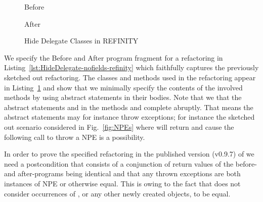 \begin{figure}[tbp]
  \captionsetup{type=lstlisting}
  \centering
  \begin{sublstlisting}[b]{.4\linewidth}
    
    \caption{Before}
    \label{lst:HideDelegate-nofields-resource-refinity}
  \end{sublstlisting}\hspace{1cm}
  \begin{sublstlisting}[b]{.4\linewidth}
    
    \caption{After}
    \label{lst:HideDelegate-nofields-owner-refinity}
  \end{sublstlisting}
\caption{Hide Delegate Classes in REFINITY}
\label{lst:HideDelegate-nofields-classes-refinity}
\end{figure}
We specify the Before and After program fragment for a  refactoring in Listing~\ref{lst:HideDelegate-nofields-refinity} which faithfully captures the previously sketched out refactoring.
The classes and methods used in the refactoring appear in Listing~\ref{lst:HideDelegate-nofields-classes-refinity} and show that we minimally specify the contents of the involved methods by using abstract
statements in their bodies.
Note that we  that the abstract statements  and  in the methods  and   complete abruptly.
That means the abstract statements may for instance throw exceptions; for instance the sketched out scenario considered in Fig.~\ref{fig:NPEs} where  will return  and cause the following call to throw a NPE is a possibility.

In order to prove the specified  refactoring in the published version (v0.9.7) of \Refinity{} we need a postcondition that consists of a conjunction of return values of the before- and after-programs being identical and
that any thrown exceptions are both instances of NPE or otherwise equal.
This is owing to the fact that \Refinity{} does not consider occurrences of , or any other newly created objects, to be equal.



